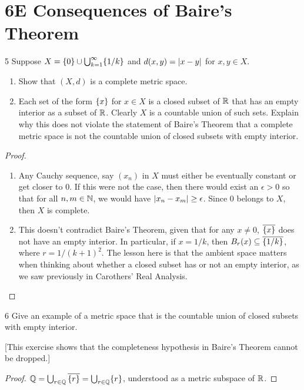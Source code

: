 \section{6E Consequences of Baire's Theorem}


\begin{exercise}{5}
Suppose $X = \{0\} \cup \bigcup_{k = 1}^\infty \{1/k\}$ and $d(x, y) = \left\lvert x - y\right\rvert$ for $x, y \in X$.
\begin{enumerate}
    \item Show that $(X, d)$ is a complete metric space.
    \item Each set of the form $\{x\}$ for $x \in X$ is a closed subset of $\mathbb{R}$ that has an empty interior as a subset of $\mathbb{R}$.
    Clearly $X$ is a countable union of such sets.
    Explain why this does not violate the statement of Baire's Theorem that a complete metric space is not the countable union of closed subsets with empty interior.
\end{enumerate}
\end{exercise}
\begin{proof}
\begin{enumerate}
    \item Any Cauchy sequence, say $(x_n)$ in $X$ must either be eventually constant or get closer to 0.
    If this were not the case, then there would exist an $\epsilon > 0$ so that for all $n, m \in \mathbb{N}$, we would have $\left\lvert x_n - x_m\right\rvert \geq \epsilon$.
    Since 0 belongs to $X$, then $X$ is complete.
    \item This doesn't contradict Baire's Theorem, given that for any $x \neq 0$, $\overline{\{x\}}$ does not have an empty interior.
    In particular, if $x = 1/k$, then $B_r(x) \subseteq \overline{\{1/k\}}$, where $r = 1/(k+1)^2$.
    The lesson here is that the ambient space matters when thinking about whether a closed subset has or not an empty interior, as we saw previously in Carothers' Real Analysis.
\end{enumerate}
\end{proof} 

\begin{exercise}{6}
Give an example of a metric space that is the countable union of closed subsets with empty interior.

[This exercise shows that the completeness hypothesis in Baire's Theorem cannot be dropped.]
\end{exercise}
\begin{proof}
$\mathbb{Q} = \bigcup_{r \in \mathbb{Q}} \overline{\{r\}} = \bigcup_{r \in \mathbb{Q}} \{r\}$, understood as a metric subspace of $\mathbb{R}$.
\end{proof} 

